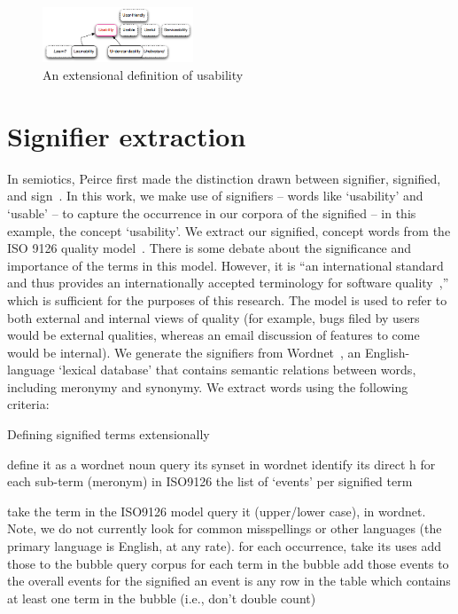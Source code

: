 \documentclass[conference, compsoc]{IEEEtran}
\begin{document}
\begin{figure}[b]
\centering
\includegraphics[width=0.4\textwidth]{synonym-graph.png}
\caption{An extensional definition of usability}
\label{fig:syngraph}
\end{figure}
	
	
\section{Signifier extraction} %
In semiotics, Peirce first made the distinction drawn between signifier, signified, and sign~\cite{atkin2006}. In this work, we make use of signifiers -- words like `usability' and `usable' -- to capture the occurrence in our corpora of the signified -- in this example, the concept `usability'. We extract our signified, concept words from the ISO 9126 quality model~\cite{iso9126}. There is some debate about the significance and importance of the terms in this model. However, it is ``an international standard and thus provides an internationally accepted terminology for software quality~\cite[p. 58]{Boegh2008},'' which is sufficient for the purposes of this research. The model is used to refer to both external and internal views of quality (for example, bugs filed by users would be external qualities, whereas an email discussion of features to come would be internal). We generate the signifiers from Wordnet~\cite{Fellbaum1998}, an English-language `lexical database' that contains semantic relations between words, including meronymy and synonymy. We extract words using the following criteria: 
\begin{algorithm}[H]
	\caption{Defining signified terms extensionally}
  \label{alg1}
\begin{algorithmic}
		\STATE define it as a wordnet noun
		\STATE query its synset in wordnet
		\STATE identify its direct h
		\STATE for each sub-term (meronym) in ISO9126 
	\ENDFOR
	\RETURN the list of `events' per signified term
	
take the term in the ISO9126 model
query it (upper/lower case), in wordnet. Note, we do not currently look for common misspellings or other languages (the primary language is English, at any rate).
for each occurrence, take its uses
add those to the bubble
query corpus for each term in the bubble
	add those events to the overall events for the signified
	an event is any row in the table which contains at least one term in the bubble (i.e., don't double count)

\end{algorithmic}
\end{algorithm}
\end{document}
